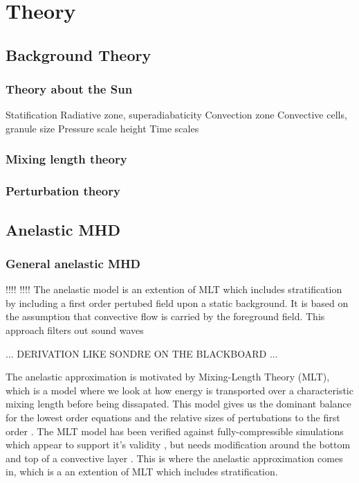 \chapter{Theory}
\section{Background Theory}
\subsection{Theory about the Sun}
Statification
Radiative zone, superadiabaticity
Convection zone
Convective cells, granule size
Pressure scale height
Time scales

\subsection{Mixing length theory}
\subsection{Perturbation theory}

\section{Anelastic MHD}
\subsection{General anelastic MHD}
!!!!
!!!!
The anelastic model is an extention of MLT which includes stratification by including a first order pertubed field upon a static background. It is based on the assumption that convective flow is carried by the foreground field. This approach filters out sound waves 

... DERIVATION LIKE SONDRE ON THE BLACKBOARD ...


The anelastic approximation is motivated by Mixing-Length Theory (MLT), which is a model where we look at how energy is transported over a characteristic mixing length before being dissapated. This model gives us the dominant balance for the lowest order equations and the relative sizes of pertubations to the first order \citep{1999ApJS..121..247L}. The MLT model has been verified against fully-compressible simulations which appear to support it's validity \citep{1989ApJ...336.1022C}, but needs modification around the bottom and top of a convective layer \citep{1996ApJ...466..372C}. This is where the anelastic approximation comes in, which is a an extention of MLT which includes stratification. 

